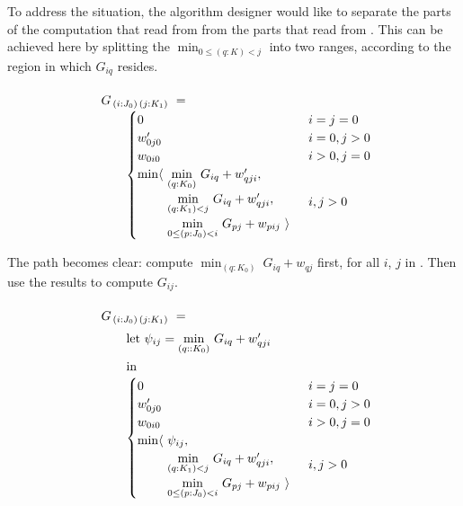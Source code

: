 To address the situation, the algorithm designer would like to separate the parts
of the computation that read from  from the parts that read from .
This can be achieved here by splitting the $\min_{0\leq(q:K)<j}$ into two
ranges, according to the region in which $G_{iq}$ resides.

\begin{equation}\LeftEqNo
\renewcommand\arraystretch{1.5}
\begin{array}{l@{}l}
	G_{\,(i : J_0)\,(j : K_1)} ~=~  \\
	\qquad
	\begin{cases}
		0                        & i=j=0 \\
		w'_{0j0}                 & i=0, j>0 \\
		w_{0i0}                  & i>0, j=0 \\
		\begin{array}{@{}l@{~}l}
		  \min\langle & \underset{(q:K_0)}\min ~ G_{iq} + w'_{qji}, \\
		              & \underset{(q:K_1) <j}\min ~ G_{iq} + w'_{qji}, \\
		              & \underset{0\leq (p:J_0) <i}\min ~ G_{pj} + w_{pij}~\rangle
		\end{array}              & i,j>0
	\end{cases}
\end{array}
\end{equation}

\medskip
The path becomes clear: compute $\min_{(q:K_0)} ~ G_{iq} + w_{qj}$ first, for all $i$, $j$
in . Then use the results to compute $G_{ij}$.

\begin{equation}\LeftEqNo
\renewcommand\arraystretch{1.5}
\begin{array}{l@{}l}
	G_{\,(i : J_0)\,(j : K_1)} ~=~  \\
	\qquad
	\textrm{let}~\psi_{ij} = \underset{(q::K_0)}\min ~ G_{iq} + w'_{qji} \\
	\qquad\textrm{in} \\
	\qquad
	\begin{cases}
		0                        & i=j=0 \\
		w'_{0j0}                 & i=0, j>0 \\
		w_{0i0}                  & i>0, j=0 \\
		\begin{array}{@{}l@{~}l}
		  \min\langle & \psi_{ij}, \\
		              & \underset{(q:K_1) <j}\min ~ G_{iq} + w'_{qji}, \\
		              & \underset{0\leq (p:J_0) <i}\min ~ G_{pj} + w_{pij}~\rangle
		\end{array}              & i,j>0
	\end{cases}
\end{array}
\label{intro:let in 2}
\end{equation}

